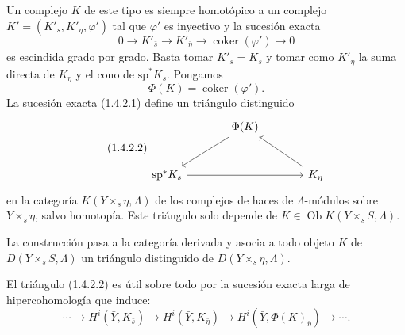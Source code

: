 Un complejo $K$ de este tipo es siempre homotópico a un complejo
$K'=(K'_s,K'_\eta,\varphi')$ tal que $\varphi'$ es inyectivo y la sucesión
exacta
\begin{equation}\tag{1.4.2.1}
0\longrightarrow K'_{\bar s}
\longrightarrow K'_{\bar\eta}
\longrightarrow\operatorname{coker}(\varphi')
\longrightarrow0
\end{equation}
es escindida grado por grado. Basta tomar $K'_s=K_s$ y tomar como $K'_\eta$
la suma directa de $K_\eta$ y el cono de $\mathrm{sp}^*K_s$. Pongamos
\begin{equation*}
\Phi(K)=\operatorname{coker}(\varphi').
\end{equation*}
La sucesión exacta (1.4.2.1) define un triángulo distinguido
\begin{equation}\tag{1.4.2.2}
\begin{tikzcd}[column sep=large, row sep=large]
{} & \Phi(K) \arrow[dl] & {} \\
\mathrm{sp}^*K_s \arrow[rr] & {} & K_\eta \arrow[ul]
\end{tikzcd}
\end{equation}
en la categoría $K(Y\times_s\eta,\Lambda)$ de los complejos de haces de
$\Lambda$-módulos sobre $Y\times_s\eta$, salvo homotopía. Este triángulo solo
depende de $K\in\operatorname{Ob}K(Y\times_sS,\Lambda)$.

\pageoriginale

La construcción pasa a la categoría derivada y asocia a todo objeto $K$ de
$D(Y\times_sS,\Lambda)$ un triángulo distinguido de
$D(Y\times_s\eta,\Lambda)$.

El triángulo (1.4.2.2) es útil sobre todo por la sucesión exacta larga de
hipercohomología que induce:
\begin{equation*}
\cdots\longrightarrow H^i(\bar Y,K_{\bar s})
\longrightarrow H^i(\bar Y,K_{\bar\eta})
\longrightarrow H^i(\bar Y,\Phi(K)_{\bar\eta})
\longrightarrow\cdots.
\end{equation*}

